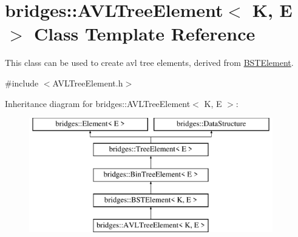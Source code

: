 \hypertarget{classbridges_1_1_a_v_l_tree_element}{}\section{bridges\+:\+:A\+V\+L\+Tree\+Element$<$ K, E $>$ Class Template Reference}
\label{classbridges_1_1_a_v_l_tree_element}


This class can be used to create avl tree elements, derived from \mbox{\hyperlink{classbridges_1_1_b_s_t_element}{B\+S\+T\+Element}}.  




{\ttfamily \#include $<$A\+V\+L\+Tree\+Element.\+h$>$}

Inheritance diagram for bridges\+:\+:A\+V\+L\+Tree\+Element$<$ K, E $>$\+:\begin{figure}[H]
\begin{center}
\leavevmode
\includegraphics[height=5.000000cm]{classbridges_1_1_a_v_l_tree_element}
\end{center}
\end{figure}
